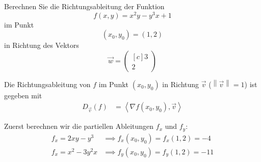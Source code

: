 \documentclass[answers]{exam}
\newcommand{\norm}[1]{\left\| #1 \right\|}
\newcommand{\scalarprod}[1]{\left\langle #1 \right\rangle}
\newcommand{\vektor}[1]{\begin{pmatrix*}[c] #1 \end{pmatrix*}}
\newcommand{\R}{\mathbb{R}}
\begin{document}
\begin{questions}

    \newpage

    \question
    Berechnen Sie die Richtungsableitung der Funktion
    $$
        f(x, y) = x^2y - y^3x + 1
    $$
    im Punkt
    $$
        (x_0, y_0) = (1, 2)
    $$
    in Richtung des Vektors
    $$
        \vec{w} = \vektor{3 \\ 2}
    $$
    \begin{solution}
        Die Richtungsableitung von $f$ im Punkt $(x_0, y_0)$ in Richtung $\vec{v}$ ($\norm{\vec{v}} = 1$) ist gegeben mit
        $$
            \begin{aligned}
                D_{\vec{v}}(f) & = \scalarprod{\nabla f(x_0, y_0), \vec{v}}
            \end{aligned}
        $$

        Zuerst berechnen wir die partiellen Ableitungen $f_x$ und $f_y$:
        $$
            \begin{aligned}
                f_x = 2xy - y^3   & \implies f_x(x_0, y_0) = f_x(1, 2) = -4  \\
                f_x = x^2 - 3y^2x & \implies f_y(x_0, y_0) = f_y(1, 2) = -11
            \end{aligned}
        $$


\end{solution}
\end{questions}
\end{document}
